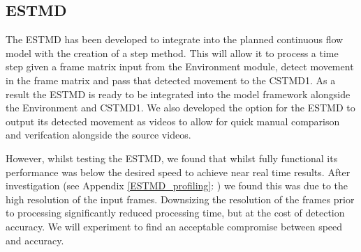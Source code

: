 \subsection{ESTMD}
The ESTMD has been developed to integrate into the planned continuous flow model with the creation of a step method. This will allow it to process a time step given a frame matrix input from the Environment module, detect movement in the frame matrix and pass that detected movement to the CSTMD1. As a result the ESTMD is ready to be integrated into the model framework alongside the Environment and CSTMD1. We also developed the option for the ESTMD to output its detected movement as videos to allow for quick manual comparison and verifcation alongside the source videos.

However, whilst testing the ESTMD, we found that whilst fully functional its performance was below the desired speed to achieve near real time results. After investigation (see Appendix \ref{ESTMD_profiling}: ) we found this was due to the high resolution of the input frames. Downsizing the resolution of the frames prior to processing significantly reduced processing time, but at the cost of detection accuracy. We will experiment to find an acceptable compromise between speed and accuracy.

